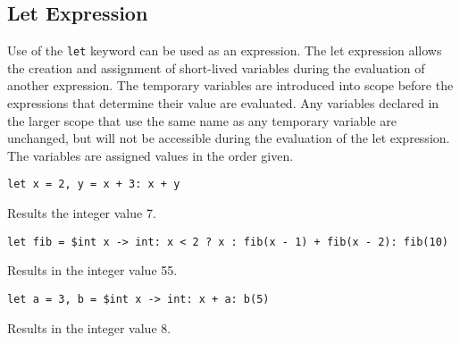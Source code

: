 
\subsection{Let Expression}
{
	Use of the \lstinline[language=MAIA, columns=fixed]@let@ keyword can be used as an expression.
	The let expression allows the creation and assignment
	of short-lived variables
	during the evaluation of another expression.
	The temporary variables are introduced into scope before the expressions
	that determine their value are evaluated.
	Any variables declared in the larger scope that use the same name as
	any temporary variable are unchanged, but will not be accessible during
	the evaluation of the let expression.
	The variables are assigned values in the order given.
	
	\begin{itemize}
	{
		\item[] \lstinline[language=MAIA, columns=fixed]@let x = 2, y = x + 3: x + y@
		
			Results the integer value 7.
		
		\item[] \lstinline[language=MAIA, columns=fixed]@let fib = $int x -> int: x < 2 ? x : fib(x - 1) + fib(x - 2): fib(10)@
		
			Results in the integer value 55.
		
		\item[] \lstinline[language=MAIA, columns=fixed]@let a = 3, b = $int x -> int: x + a: b(5)@
		
			Results in the integer value 8.
	}
	\end{itemize}
}
